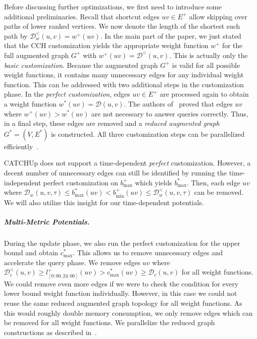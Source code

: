 \documentclass[a4paper,UKenglish,cleveref, autoref, thm-restate,anonymous]{lipics-v2021}
\newcommand*{\comb}{c}
\newcommand*{\dist}{\mathcal{D}}
\begin{document}
Before discussing further optimizations, we first need to introduce some additional preliminaries.
Recall that shortcut edges $uv \in E^+$ allow skipping over paths of lower ranked vertices.
We now denote the length of the shortest such path by $\dist^<_w(u,v) = w^+(uv)$.
In the main part of the paper, we just stated that the CCH customization yields the appropriate weight function $w^+$ for the full augmented graph $G^+$ with $w^+(uv) = \dist^<(u,v)$.
This is actually only the \emph{basic customization}.
Because the augmented graph $G^+$ is valid for all possible weight functions, it contains many unnecessary edges for any individual weight function.
This can be addressed with two additional steps in the customization phase.
In the \emph{perfect customization}, edges $uv \in E^+$ are processed again to obtain a weight function $w^*(uv) = \dist(u,v)$.
The authors of~\cite{dsw-cch-15} proved that edges $uv$ where $w^+(uv) > w^*(uv)$ are not necessary to answer queries correctly.
Thus, in a final step, these edges are removed and a \emph{reduced augmented graph} $G^*=(V, E^*)$ is constructed.
All three customization steps can be parallelized efficiently~\cite{bsw-rttau-19}.

CATCHUp does not support a time-dependent \emph{perfect} customization.
However, a decent number of unnecessary edges can still be identified by running the time-independent perfect customization on $b^+_{\max}$ which yields $b^*_{\max}$.
Then, each edge $uv$ where $\dist_w(u,v,\tau) \leq b^*_{\max}(uv) < b^+_{\min}(uv) \leq \dist^<_w(u,v,\tau)$ can be removed.
We will also utilize this insight for our time-dependent potentials.

\subparagraph{Multi-Metric Potentials.}
During the update phase, we also run the perfect customization for the upper bound and obtain $\comb^*_{\max}$.
This allows us to remove unnecessary edges and accelerate the query phase.
We remove edges $uv$ where $\dist^<_c(u,v) \geq l_{[0:00, 24:00]}^+(uv) > \comb^*_{\max}(uv) \geq \dist_c(u,v)$ for all weight functions.
We could remove even more edges if we were to check the condition for every lower bound weight function individually.
However, in this case we could not reuse the same reduced augmented graph topology for all weight functions.
As this would roughly double memory consumption, we only remove edges which can be removed for all weight functions.
We parallelize the reduced graph constructions as described in~\cite{bsw-rttau-19}.
\end{document}
